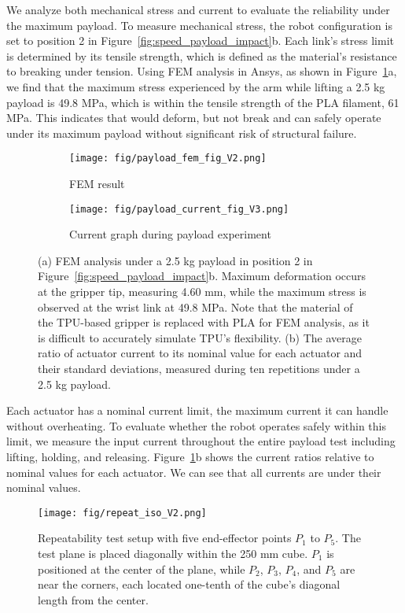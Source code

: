 We analyze both mechanical stress and current to evaluate the reliability under the maximum payload. To measure mechanical stress, the robot configuration is set to position 2 in Figure~\ref{fig:speed_payload_impact}b. Each link’s stress limit is determined by its tensile strength, which is defined as the material’s resistance to breaking under tension. Using FEM analysis in Ansys, as shown in Figure~\ref{fig:payload}a, we find that the maximum stress experienced by the arm while lifting a 2.5 kg payload is 49.8 MPa, which is within the tensile strength of the PLA filament, 61 MPa. This indicates that \robot would deform, but not break and can safely operate under its maximum payload without significant risk of structural failure.

\begin{figure}[hbt]
\begin{subfigure}{\linewidth}
    \centering
    \texttt{[image: fig/payload\_fem\_fig\_V2.png]}
    \caption{FEM result}
\end{subfigure}
\vfill
\begin{subfigure}{\linewidth}
    \centering
    \texttt{[image: fig/payload\_current\_fig\_V3.png]}
    \caption{Current graph during payload experiment}
\end{subfigure}
\caption{(a) FEM analysis under a 2.5 kg payload in position 2 in Figure~\ref{fig:speed_payload_impact}b. Maximum deformation occurs at the gripper tip, measuring 4.60 mm, while the maximum stress is observed at the wrist link at 49.8 MPa. Note that the material of the TPU-based gripper is replaced with PLA for FEM analysis, as it is difficult to accurately simulate TPU's flexibility. (b) The average ratio of actuator current to its nominal value for each actuator and their standard deviations, measured during ten repetitions under a 2.5 kg payload.} 
\label{fig:payload}
\end{figure}

Each actuator has a nominal current limit, the maximum current it can handle without overheating. To evaluate whether the robot operates safely within this limit, we measure the input current throughout the entire payload test including lifting, holding, and releasing. Figure~\ref{fig:payload}b shows the current ratios relative to nominal values for each actuator. We can see that all currents are under their nominal values.

\begin{figure}[hbt]
    \centering
    \texttt{[image: fig/repeat\_iso\_V2.png]}
    \caption{Repeatability test setup with five end-effector points $P_1$ to $P_5$. The test plane is placed diagonally within the 250 mm cube. $P_1$ is positioned at the center of the plane, while $P_2$, $P_3$, $P_4$, and $P_5$ are near the corners, each located one-tenth of the cube's diagonal length from the center.}
    \label{fig:repeatability}
\end{figure}

